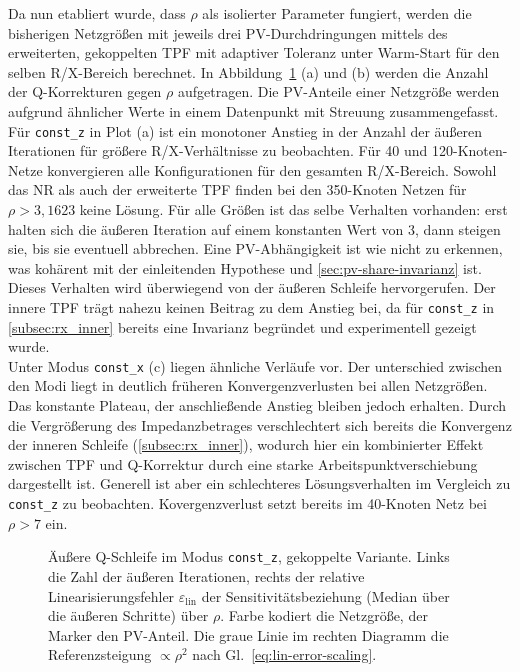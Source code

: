 Da nun etabliert wurde, dass $\rho$ als isolierter Parameter fungiert, werden die bisherigen Netzgrößen mit jeweils drei PV-Durchdringungen mittels des erweiterten, gekoppelten TPF mit adaptiver Toleranz unter Warm-Start für den selben R/X-Bereich berechnet.
In Abbildung~\ref{fig:rx-outer} (a) und (b) werden die Anzahl der Q-Korrekturen gegen $\rho$ aufgetragen.
Die PV-Anteile einer Netzgröße werden aufgrund ähnlicher Werte in einem Datenpunkt mit Streuung zusammengefasst.\\

Für \texttt{const\_z} in Plot (a) ist ein monotoner Anstieg in der Anzahl der äußeren Iterationen für größere R/X-Verhältnisse zu beobachten.
Für 40 und 120-Knoten-Netze konvergieren alle Konfigurationen für den gesamten R/X-Bereich.
Sowohl das NR als auch der erweiterte TPF finden bei den 350-Knoten Netzen für $\rho>3,1623$ keine Lösung.
Für alle Größen ist das selbe Verhalten vorhanden: erst halten sich die äußeren Iteration auf einem konstanten Wert von 3, dann steigen sie, bis sie eventuell abbrechen.
Eine PV-Abhängigkeit ist wie nicht zu erkennen, was kohärent mit der einleitenden Hypothese und \cref{sec:pv-share-invarianz} ist.
Dieses Verhalten wird überwiegend von der äußeren Schleife hervorgerufen.
Der innere TPF trägt nahezu keinen Beitrag zu dem Anstieg bei, da für \texttt{const\_z} in \cref{subsec:rx_inner} bereits eine Invarianz begründet und experimentell gezeigt wurde.\\

Unter Modus \texttt{const\_x} (c) liegen ähnliche Verläufe vor. 
Der unterschied zwischen den Modi liegt in deutlich früheren Konvergenzverlusten bei allen Netzgrößen.
Das konstante Plateau, der anschließende Anstieg bleiben jedoch erhalten.
Durch die Vergrößerung des Impedanzbetrages verschlechtert sich bereits die Konvergenz der inneren Schleife (\cref{subsec:rx_inner}), wodurch hier ein kombinierter Effekt zwischen TPF und Q-Korrektur durch eine starke Arbeitspunktverschiebung dargestellt ist. 
Generell ist aber ein schlechteres Lösungsverhalten im Vergleich zu \texttt{const\_z} zu beobachten. 
Kovergenzverlust setzt bereits im 40-Knoten Netz bei $\rho>7$ ein.\\

\begin{figure}[htbp]
	\centering
	
	\caption{Äußere Q-Schleife im Modus \texttt{const\_z}, gekoppelte Variante.
		Links die Zahl der äußeren Iterationen, rechts der relative
		Linearisierungsfehler $\varepsilon_{\mathrm{lin}}$ der
		Sensitivitätsbeziehung (Median über die äußeren Schritte) über $\rho$. Farbe
		kodiert die Netzgröße, der Marker den PV-Anteil. Die graue Linie im
		rechten Diagramm die Referenzsteigung $\propto\rho^{2}$ nach
		Gl.~\eqref{eq:lin-error-scaling}.}
	\label{fig:rx-outer}
\end{figure}

